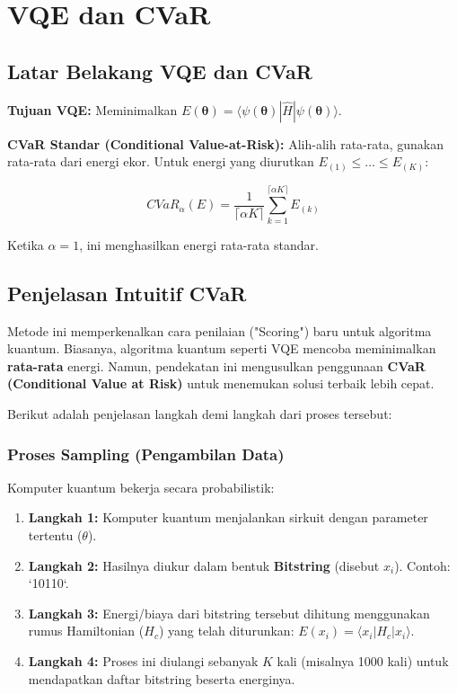 \section{VQE dan CVaR}

\subsection{Latar Belakang VQE dan CVaR}

\textbf{Tujuan VQE:} Meminimalkan $E(\boldsymbol{\theta}) = \langle \psi(\boldsymbol{\theta}) | \hat{H} | \psi(\boldsymbol{\theta}) \rangle$.

\textbf{CVaR Standar (Conditional Value-at-Risk):} Alih-alih rata-rata, gunakan rata-rata dari energi ekor. Untuk energi yang diurutkan $E_{(1)} \le \dots \le E_{(K)}$:

\begin{equation}
    CVaR_\alpha(E) = \frac{1}{\lceil \alpha K \rceil} \sum_{k=1}^{\lceil \alpha K \rceil} E_{(k)}
\end{equation}

Ketika $\alpha = 1$, ini menghasilkan energi rata-rata standar.

\subsection{Penjelasan Intuitif CVaR}

Metode ini memperkenalkan cara penilaian ("Scoring") baru untuk algoritma kuantum. Biasanya, algoritma kuantum seperti VQE mencoba meminimalkan \textbf{rata-rata} energi. Namun, pendekatan ini mengusulkan penggunaan \textbf{CVaR (Conditional Value at Risk)} untuk menemukan solusi terbaik lebih cepat.

Berikut adalah penjelasan langkah demi langkah dari proses tersebut:

\subsubsection{Proses Sampling (Pengambilan Data)}
Komputer kuantum bekerja secara probabilistik:
\begin{enumerate}
    \item \textbf{Langkah 1:} Komputer kuantum menjalankan sirkuit dengan parameter tertentu ($\theta$).
    \item \textbf{Langkah 2:} Hasilnya diukur dalam bentuk \textbf{Bitstring} (disebut $x_i$). Contoh: `10110`.
    \item \textbf{Langkah 3:} Energi/biaya dari bitstring tersebut dihitung menggunakan rumus Hamiltonian ($H_c$) yang telah diturunkan: $E(x_i) = \langle x_i | H_c | x_i \rangle$.
    \item \textbf{Langkah 4:} Proses ini diulangi sebanyak $K$ kali (misalnya 1000 kali) untuk mendapatkan daftar bitstring beserta energinya.
\end{enumerate}

